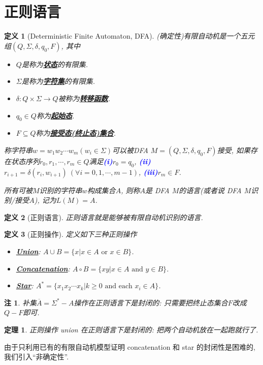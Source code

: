 \documentclass[8pt]{article}
\theoremstyle{compact}
\newtheorem{theorem}{定理}[section]
\newtheorem{definition}{定义}[section]
\newtheorem{remark}{注}[section]
\def\obj#1{\textbf{\uline{#1}}}
\def\num#1{\textnormal{\textbf{\mbox{\textcolor{blue}{(#1)}}}}}
\def\ge{\geqslant}
\begin{document}
\section{正则语言}
\begin{definition}[Deterministic Finite Automaton, DFA]
	(确定性)有限自动机是一个五元组$(Q, \Sigma, \delta, q_0, F)$, 其中
	\begin{itemize}
		\item $Q$是称为\obj{状态}的有限集. 
		\item $\Sigma$是称为\obj{字符集}的有限集. 
		\item $\delta: Q \times \Sigma \to Q$被称为\obj{转移函数}. 
		\item $q_0 \in Q$称为\obj{起始态}. 
		\item $F \subseteq Q$称为\obj{接受态(终止态)集合}. 
	\end{itemize}

	称字符串$w = w_1w_2\cdots w_m(w_i \in \Sigma)$可以被DFA $M = (Q, \Sigma, \delta, q_0, F)$接受, 如果存在状态序列$r_0, r_1, \cdots, r_m \in Q$满足\num{i}$r_0 = q_0$, \num{ii}$r_{i+1} = \delta(r_i, w_{i+1}) \ (\forall i = 0, 1, \cdots, m-1)$, \num{iii}$r_m \in F$. 

	所有可被$M$识别的字符串$w$构成集合$A$, 则称$A$是 DFA $M$的语言(或者说 DFA $M$识别/接受$A$), 记为$L(M) = A$.
\end{definition}
\begin{definition}[正则语言]
	正则语言就是能够被有限自动机识别的语言. 
\end{definition}
\begin{definition}[正则操作]
	定义如下三种正则操作
	\begin{itemize}
		\item \obj{Union}: $A \cup B = \{x | x \in A \textrm{ or } x \in B\}$.
		\item \obj{Concatenation}: $A \circ B = \{xy | x \in A \textrm{ and } y \in B\}$.
		\item \obj{Star}: $A^* = \{x_1x_2\cdots x_k | k \ge 0 \textrm{ and each } x_i \in A\}$.
	\end{itemize}
\end{definition}
\begin{remark}
	补集$\overline{A} = \Sigma^* - A$操作在正则语言下是封闭的: 只需要把终止态集合$F$改成$Q - F$即可.
\end{remark}
\begin{theorem}
	正则操作 union 在正则语言下是封闭的: 把两个自动机放在一起跑就行了. 
\end{theorem}
由于只利用已有的有限自动机模型证明 concatenation 和 star 的封闭性是困难的, 我们引入“非确定性”. 
\end{document}
